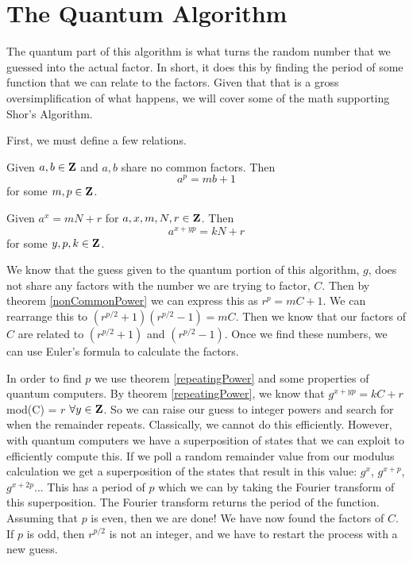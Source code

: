 \documentclass[a4paper]{article}
\begin{document}
\section{The Quantum Algorithm}
\label{quantumSec}

The quantum part of this algorithm is what turns the random number that we guessed into the actual factor. In short, it does this by finding the period of some function that we can relate to the factors. Given that that is a gross oversimplification of what happens, we will cover some of the math supporting Shor's Algorithm. 

First, we must define a few relations. 

\begin{theorem} %

Given $a,b \in \mathbf{Z}$ and $a,b$ share no common factors. Then 
$$a^p = mb + 1$$
for some $m,p \in \mathbf{Z}$.
\label{nonCommonPower}
\end{theorem}


\begin{theorem} %

Given $a^x = mN + r$ for $a,x,m,N,r \in \mathbf{Z}$. Then
$$a^{x + yp} = kN + r$$
for some $y,p,k \in \mathbf{Z}$.
\label{repeatingPower}
\end{theorem}

We know that the guess given to the quantum portion of this algorithm, $g$, does not share any factors with the number we are trying to factor, $C$. Then by theorem \ref{nonCommonPower} we can express this as $r^p = mC + 1$. We can rearrange this to $(r^{p/2} + 1)(r^{p/2} - 1) = mC$. Then we know that our factors of $C$ are related to $(r^{p/2} + 1)$ and $(r^{p/2} - 1)$. Once we find these numbers, we can use Euler's formula to calculate the factors. 

In order to find $p$ we use theorem \ref{repeatingPower} and some properties of quantum computers. By theorem \ref{repeatingPower}, we know that $g^{x + yp} = kC + r$ mod(C) = $r$ $\forall y \in \mathbf{Z}$. So we can raise our guess to integer powers and search for when the remainder repeats. Classically, we cannot do this efficiently. However, with quantum computers we have a superposition of states that we can exploit to efficiently compute this. If we poll a random remainder value from our modulus calculation we get a superposition of the states that result in this value: $g^{x}$, $g^{x + p}$, $g^{x+2p}$... This has a period of $p$ which we can by taking the Fourier transform of this superposition. The Fourier transform returns the period of the function. Assuming that $p$ is even, then we are done! We have now found the factors of $C$. If $p$ is odd, then $r^{p/2}$ is not an integer, and we have to restart the process with a new guess. 
\end{document}
